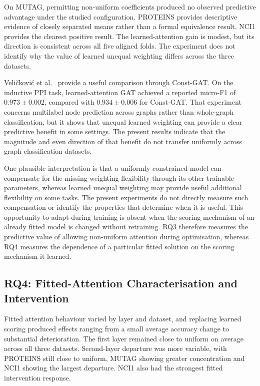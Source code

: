 \documentclass[11pt,a4paper]{article}
\begin{document}
On MUTAG, permitting non-uniform coefficients produced no observed predictive advantage under the studied configuration. PROTEINS provides descriptive evidence of closely separated means rather than a formal equivalence result. NCI1 provides the clearest positive result. The learned-attention gain is modest, but its direction is consistent across all five aligned folds. The experiment does not identify why the value of learned unequal weighting differs across the three datasets.

Veli\v{c}kovi\'{c} et al.~\cite{velickovic2018gat} provide a useful comparison through Const-GAT. On the inductive PPI task, learned-attention GAT achieved a reported micro-F1 of \(0.973\pm0.002\), compared with \(0.934\pm0.006\) for Const-GAT. That experiment concerns multilabel node prediction across graphs rather than whole-graph classification, but it shows that unequal learned weighting can provide a clear predictive benefit in some settings. The present results indicate that the magnitude and even direction of that benefit do not transfer uniformly across graph-classification datasets.

One plausible interpretation is that a uniformly constrained model can compensate for the missing weighting flexibility through its other trainable parameters, whereas learned unequal weighting may provide useful additional flexibility on some tasks. The present experiments do not directly measure such compensation or identify the properties that determine when it is useful. This opportunity to adapt during training is absent when the scoring mechanism of an already fitted model is changed without retraining. RQ3 therefore measures the predictive value of allowing non-uniform attention during optimisation, whereas RQ4 measures the dependence of a particular fitted solution on the scoring mechanism it learned.

\subsection{RQ4: Fitted-Attention Characterisation and Intervention}
\label{sec:discussion-rq4}

Fitted attention behaviour varied by layer and dataset, and replacing learned scoring produced effects ranging from a small average accuracy change to substantial deterioration. The first layer remained close to uniform on average across all three datasets. Second-layer departure was more variable, with PROTEINS still close to uniform, MUTAG showing greater concentration and NCI1 showing the largest departure. NCI1 also had the strongest fitted intervention response.
\end{document}
